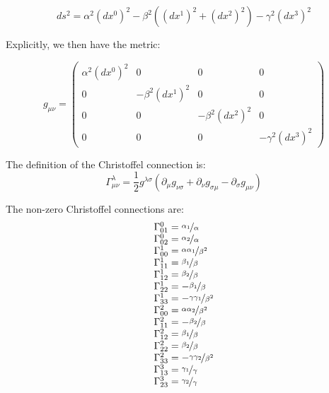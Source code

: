 \documentclass{article}
\begin{document}
\begin{equation}
ds^{2}=\alpha^{2} \left(dx^{0}\right)^{2}-\beta^{2}\left(\left(dx^{1}\right)^{2}+\left(dx^{2}\right)^{2}\right)-\gamma^{2}\left(dx^{3}\right)^{2}\label{eq:generic-axisymmetric-static-metric}
\end{equation}

Explicitly, we then have the metric:

\begin{equation}
g_{\mu\nu}=\left(\begin{array}{cccc}
\alpha^{2}\left(dx^{0}\right)^{2} & 0 & 0 & 0\\
0 & -\beta^{2}\left(dx^{1}\right)^{2} & 0 & 0\\
0 & 0 & -\beta^{2}\left(dx^{2}\right)^{2} & 0\\
0 & 0 & 0 & -\gamma^{2}\left(dx^{3}\right)^{2}
\end{array}\right)\label{eq:general-axisymmetric-static-matrix-metric}
\end{equation}

The definition of the Christoffel connection is: \cite{carroll2003spacetime} 
\begin{equation}
\Gamma_{\mu\nu}^{\lambda}=\frac{1}{2}g^{\lambda\sigma}\left(\partial_{\mu}g_{\nu\sigma}+\partial_{\nu}g_{\sigma\mu}-\partial_{\sigma}g_{\mu\nu}\right)
\end{equation}

The non-zero Christoffel connections are:
\begin{equation}
\begin{array}{l}
\Gamma_{01}^{0}=\nicefrac{\alpha_{1}}{\alpha}\\
\Gamma_{02}^{0}=\nicefrac{\alpha_{2}}{\alpha}\\
\Gamma_{00}^{1}=\nicefrac{\alpha \alpha_{1}}{\beta^{2}}\\
\Gamma_{11}^{1}=\nicefrac{\beta_{1}}{\beta}\\
\Gamma_{12}^{1}=\nicefrac{\beta_{2}}{\beta}\\
\Gamma_{22}^{1}=-\nicefrac{\beta_{1}}{\beta}\\
\Gamma_{33}^{1}=-\nicefrac{\gamma\gamma_{1}}{\beta^{2}}\\
\Gamma_{00}^{2}=\nicefrac{\alpha\alpha_{2}}{\beta^{2}}\\
\Gamma_{11}^{2}=-\nicefrac{\beta_{2}}{\beta}\\
\Gamma_{12}^{2}=\nicefrac{\beta_{1}}{\beta}\\ 
\Gamma_{22}^{2}=\nicefrac{\beta_{2}}{\beta}\\
\Gamma_{33}^{2}=-\nicefrac{\gamma\gamma_{2}}{\beta^{2}}\\
\Gamma_{13}^{3}=\nicefrac{\gamma_{1}}{\gamma}\\
\Gamma_{23}^{3}=\nicefrac{\gamma_{2}}{\gamma}\\
\end{array}
\end{equation}
\end{document}
